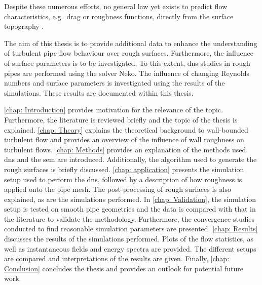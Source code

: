 Despite these numerous efforts, no general law yet exists to predict flow characteristics, e.g.\ drag or roughness functions, directly from the surface topography \citep{chungPredictingDragRough2021}.

The aim of this thesis is to provide additional data to enhance the understanding of turbulent pipe flow behaviour over rough surfaces.
Furthermore, the influence of surface parameters is to be investigated.
To this extent, \acrshort{dns} studies in rough pipes are performed using the solver Neko.
The influence of changing Reynolds numbers and surface parameters is investigated using the results of the simulations.
These results are documented within this thesis.

\autoref{chap: Introduction} provides motivation for the relevance of the topic.
Furthermore, the literature is reviewed briefly and the topic of the thesis is explained.
\autoref{chap: Theory} explains the theoretical background to wall-bounded turbulent flow and provides an overview of the influence of wall roughness on turbulent flows.
\autoref{chap: Methods} provides an explanation of the methods used.
\acrshort{dns} and the \acrlong{sem} are introduced.
Additionally, the algorithm used to generate the rough surfaces is briefly discussed.
\autoref{chap: application} presents the simulation setup used to perform the \acrshort{dns}, followed by a description of how roughness is applied onto the pipe mesh.
The post-processing of rough surfaces is also explained, as are the simulations performed.
In \autoref{chap: Validation}, the simulation setup is tested on smooth pipe geometries and the data is compared with that in the literature to validate the methodology.
Furthermore, the convergence studies conducted to find reasonable simulation parameters are presented.
\autoref{chap: Results} discusses the results of the simulations performed.
Plots of the flow statistics, as well as instantaneous fields and energy spectra are provided.
The different setups are compared and interpretations of the results are given.
Finally, \autoref{chap: Conclusion} concludes the thesis and provides an outlook for potential future work.


